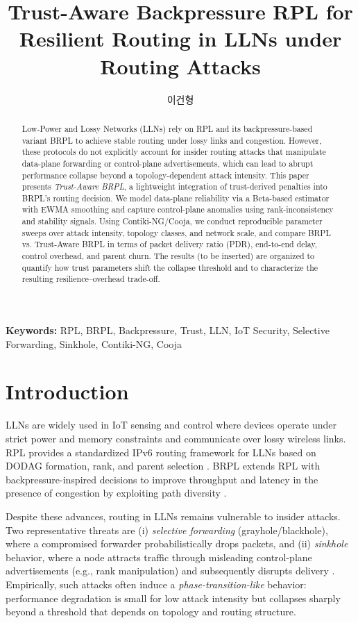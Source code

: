 \documentclass[11pt,a4paper]{article}
\title{Trust-Aware Backpressure RPL for Resilient Routing in LLNs under Routing Attacks}
\author{이건형}
\date{}
\begin{document}
\maketitle

\begin{abstract}
Low-Power and Lossy Networks (LLNs) rely on RPL and its backpressure-based variant BRPL to achieve stable routing under lossy links and congestion. However, these protocols do not explicitly account for insider routing attacks that manipulate data-plane forwarding or control-plane advertisements, which can lead to abrupt performance collapse beyond a topology-dependent attack intensity. This paper presents \emph{Trust-Aware BRPL}, a lightweight integration of trust-derived penalties into BRPL’s routing decision. We model data-plane reliability via a Beta-based estimator with EWMA smoothing and capture control-plane anomalies using rank-inconsistency and stability signals. Using Contiki-NG/Cooja, we conduct reproducible parameter sweeps over attack intensity, topology classes, and network scale, and compare BRPL vs. Trust-Aware BRPL in terms of packet delivery ratio (PDR), end-to-end delay, control overhead, and parent churn. The results (to be inserted) are organized to quantify how trust parameters shift the collapse threshold and to characterize the resulting resilience–overhead trade-off.
\end{abstract}

\noindent\textbf{Keywords:} RPL, BRPL, Backpressure, Trust, LLN, IoT Security, Selective Forwarding, Sinkhole, Contiki-NG, Cooja

\section{Introduction}
\label{sec:intro}
LLNs are widely used in IoT sensing and control where devices operate under strict power and memory constraints and communicate over lossy wireless links. RPL provides a standardized IPv6 routing framework for LLNs based on DODAG formation, rank, and parent selection \citep{rfc6550}. BRPL extends RPL with backpressure-inspired decisions to improve throughput and latency in the presence of congestion by exploiting path diversity \citep{moeller2016brpl}.

Despite these advances, routing in LLNs remains vulnerable to insider attacks. Two representative threats are (i) \emph{selective forwarding} (grayhole/blackhole), where a compromised forwarder probabilistically drops packets, and (ii) \emph{sinkhole} behavior, where a node attracts traffic through misleading control-plane advertisements (e.g., rank manipulation) and subsequently disrupts delivery \citep{karlof2003secure,wood2002dos,le2013rank,mayzaud2016taxonomy}. Empirically, such attacks often induce a \emph{phase-transition-like} behavior: performance degradation is small for low attack intensity but collapses sharply beyond a threshold that depends on topology and routing structure.
\end{document}
